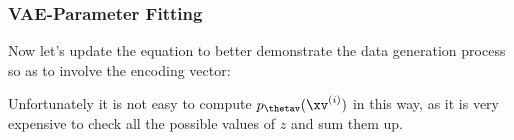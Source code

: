 \documentclass[11pt,compress,t,notes=noshow, xcolor=table]{beamer}
\begin{document}

\begin{frame}
\frametitle{VAE-Parameter Fitting}
\vspace{2mm}

Now let's update the equation to better demonstrate the data generation process so as to involve the encoding vector:

\vspace{2mm}

\vspace{2mm}

Unfortunately it is not easy to compute $ p_{\thetav} (\xv^{(i)}) $ in this way, as it is very expensive to check all the possible values of $z$ and sum them up.
\end{frame}


\end{document}
